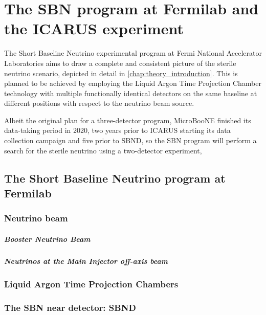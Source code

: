 
\chapter{The SBN program at Fermilab and the ICARUS experiment}
\label{chap:icarus_detector}

The Short Baseline Neutrino experimental program at Fermi National Accelerator Laboratories aims to  draw a complete and consistent picture of the sterile neutrino scenario, depicted in detail in \autoref{chap:theory_introduction}. This is planned to be achieved by employing the Liquid Argon Time Projection Chamber technology with multiple functionally identical detectors on the same baseline at different positions with respect to the neutrino beam source. 

Albeit the original plan for a three-detector program, MicroBooNE finished its data-taking period in 2020, two years prior to ICARUS starting its data collection campaign and five prior to SBND, so the SBN program will perform a search for the sterile neutrino using a two-detector experiment, 

\section{The Short Baseline Neutrino program at Fermilab}

\subsection{Neutrino beam}

\paragraph{Booster Neutrino Beam}

\paragraph{Neutrinos at the Main Injector off-axis beam}

\subsection{Liquid Argon Time Projection Chambers}

\subsection{The SBN near detector: SBND}

